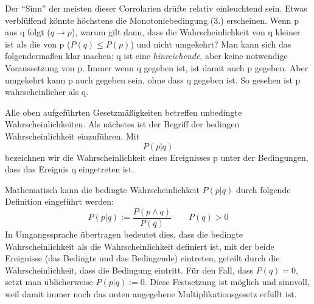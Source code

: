 Der "`Sinn"' der meisten dieser Corrolarien drüfte relativ einleuchtend sein.
Etwas verblüffend könnte höchstens die Monotoniebedingung (3.) erscheinen. Wenn
p aus q folgt ($q \rightarrow p$), warum gilt dann, dass die Wahrscheinlichkeit
von q kleiner ist als die von p ($P(q) \leq P(p)$) und nicht umgekehrt? Man
kann sich das folgendermaßen klar machen: q ist eine {\em hinreichende}, aber
keine notwendige Voraussetzung von p. Immer wenn q gegeben ist, ist damit auch
p gegeben. Aber umgekehrt kann p auch gegeben sein, ohne dass q gegeben ist. So
gesehen ist p wahrscheinlicher als q.

Alle oben aufgeführten Gesetzmäßigkeiten betreffen unbedingte
Wahrscheinlichkeiten. Als nächstes ist der Begriff der bedingen
Wahrscheinlichkeit einzuführen. Mit 
\[ P(p|q) \]
bezeichnen wir die Wahrscheinlichkeit eines Ereignisses p unter der Bedingungen,
dass das Ereignis q eingetreten ist.

Mathematisch kann die bedingte Wahrscheinlichkeit $P(p|q)$ durch folgende
Definition eingeführt werden\label{bedingteWahrscheinlichkeit}: \[ P(p|q) :=
\frac{P(p \wedge q)}{P(q)} \qquad P(q) > 0 \] In Umgangssprache übertragen
bedeutet dies, dass die bedingte Wahrscheinlichkeit als die Wahrscheinlichkeit
definiert ist, mit der beide Ereignisse (das Bedingte und das Bedingende)
eintreten, geteilt durch die Wahrscheinlichkeit, dass die Bedingung eintritt. Für
den Fall, dass $P(q)=0$, setzt man üblicherweise $P(p|q) := 0$. Diese
Festsetzung ist möglich und sinnvoll, weil damit immer noch das unten angegebene
Multiplikationsgesetz erfüllt ist.

